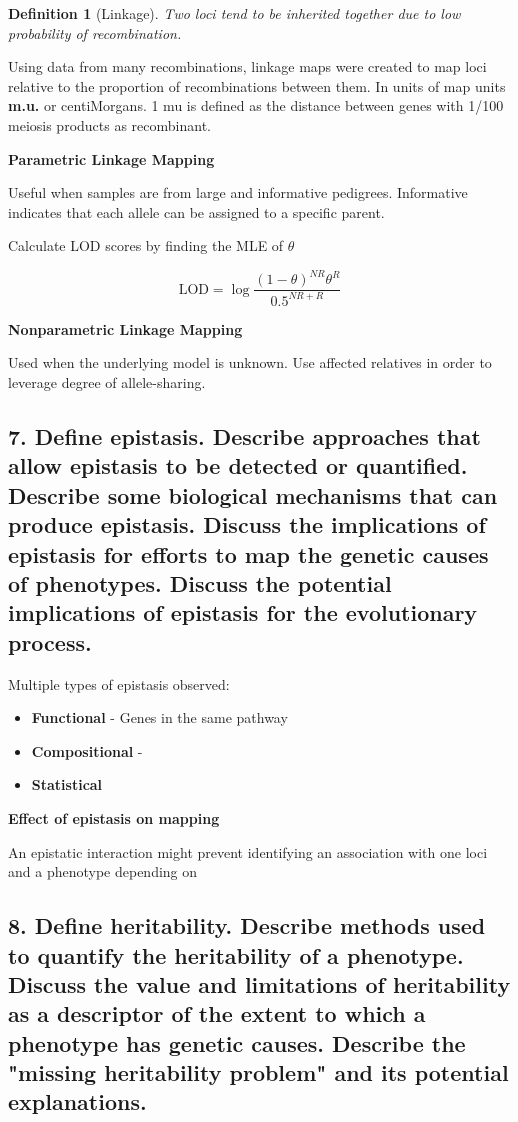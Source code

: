 \documentclass{tufte-handout}
\theoremstyle{noparens}
\newtheorem*{define}{Definition}
\begin{document}
\begin{define}[Linkage]
Two loci tend to be inherited together due to low probability of recombination.
\end{define}

Using data from many recombinations, linkage maps were created to map loci relative to the proportion of recombinations between them. In units of map units \textbf{m.u.} or centiMorgans. 1 mu is defined as the distance between genes with 1/100 meiosis products as recombinant. 

\noindent
\textbf{Parametric Linkage Mapping}

Useful when samples are from large and informative pedigrees. Informative indicates that each allele can be assigned to 	a specific parent.

Calculate LOD scores by finding the MLE of $\theta$

\[ \text{LOD} = \log \frac{(1-\theta)^{NR}\theta^R}{0.5^{NR+R}} \]

\noindent
\textbf{Nonparametric Linkage Mapping}

Used when the underlying model is unknown. Use affected relatives in order to leverage degree of allele-sharing.
\newpage
\subsection{7.
Define epistasis. Describe approaches that allow epistasis to be detected or quantified. Describe some biological mechanisms that can produce epistasis. Discuss the implications of epistasis for efforts to map the genetic causes of phenotypes. Discuss the potential implications of epistasis for the evolutionary process.}
\label{subsec:07}

Multiple types of epistasis observed:

\begin{itemize}
\item \textbf{Functional} - Genes in the same pathway
\item \textbf{Compositional} - 
\item \textbf{Statistical}
\end{itemize}

\noindent
\textbf{Effect of epistasis on mapping}

An epistatic interaction might prevent identifying an association with one loci and a phenotype depending on 
\newpage
\subsection{8.
Define heritability. Describe methods used to quantify the heritability of a phenotype. Discuss the value and limitations of heritability as a descriptor of the extent to which a phenotype has genetic causes. Describe the "missing heritability problem" and its potential explanations.}
\label{subsec:08}
\end{document}
